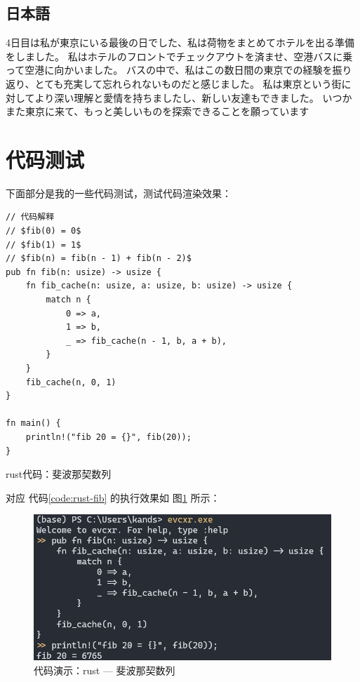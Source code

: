 \documentclass{kspaper}
\begin{document}
\subsection{日本語}

4日目は私が東京にいる最後の日でした、私は荷物をまとめてホテルを出る準備をしました。
私はホテルのフロントでチェックアウトを済ませ、空港バスに乗って空港に向かいました。
バスの中で、私はこの数日間の東京での経験を振り返り、とても充実して忘れられないものだと感じました。
私は東京という街に対してより深い理解と愛情を持ちましたし、新しい友達もできました。
いつかまた東京に来て、もっと美しいものを探索できることを願っています

\section{代码测试}

下面部分是我的一些代码测试，测试代码渲染效果：

\begin{table}[H]
    \begin{verbatim}
// 代码解释
// $fib(0) = 0$
// $fib(1) = 1$
// $fib(n) = fib(n - 1) + fib(n - 2)$
pub fn fib(n: usize) -> usize {
    fn fib_cache(n: usize, a: usize, b: usize) -> usize {
        match n {
            0 => a,
            1 => b,
            _ => fib_cache(n - 1, b, a + b),
        }
    }
    fib_cache(n, 0, 1)
}

fn main() {
    println!("fib 20 = {}", fib(20));
}
    \end{verbatim}
    \caption{rust代码：斐波那契数列}
    \label{code:rust-fib}
\end{table}

对应 代码\ref{code:rust-fib} 的执行效果如 图\ref{fig:rust-fib} 所示：

\begin{figure}[H]
    \centering
    \includegraphics[scale=0.64]{pics/rust-fib.png}
    \caption{代码演示：rust --- 斐波那契数列}
    \label{fig:rust-fib}
\end{figure}
\end{document}
